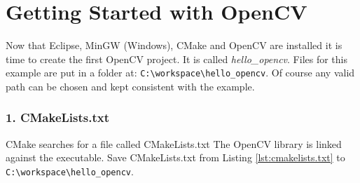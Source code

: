 % 
% 
% 

\section{Getting Started with OpenCV}
Now that Eclipse, MinGW (Windows), CMake and OpenCV are installed it is time to create the first OpenCV project. It is called \textit{hello\_opencv}. Files for this example are put in a folder at: \verb|C:\workspace\hello_opencv|. Of course any valid path can be chosen and kept consistent with the example.

\subsubsection*{1. CMakeLists.txt}
CMake searches for a file called CMakeLists.txt The OpenCV library is linked against the executable. Save CMakeLists.txt from Listing \ref{lst:cmakelists.txt} to \verb|C:\workspace\hello_opencv|.
 
